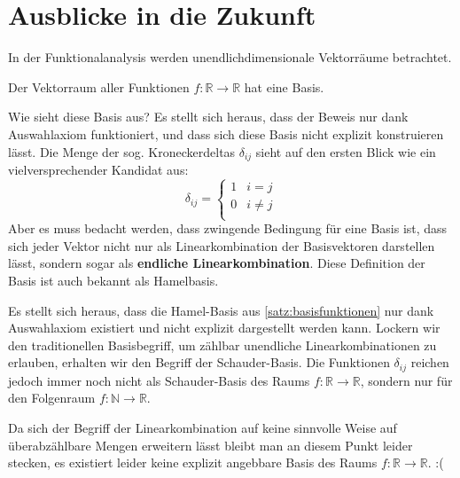 \documentclass{report}
\newcommand*{\newpar}{\par\vspace{\baselineskip}\noindent}
\newcommand{\tbf}[1]{\textbf{#1}}
\newcommand{\bN}{\mathbb{N}}
\newcommand{\bR}{\mathbb{R}}
\begin{document}
\chapter{Ausblicke in die Zukunft}
In der Funktionalanalysis werden unendlichdimensionale Vektorräume betrachtet. 
\begin{theorem}
\label{satz:basisfunktionen}
Der Vektorraum aller Funktionen $f: \bR \to \bR$ hat eine Basis.
\end{theorem}
\newpar
Wie sieht diese Basis aus? Es stellt sich heraus, dass der Beweis nur dank Auswahlaxiom funktioniert, und dass sich diese Basis nicht explizit konstruieren lässt. Die Menge der sog. Kroneckerdeltas $\delta_{ij}$ sieht auf den ersten Blick wie ein vielversprechender Kandidat aus:
\begin{equation*}
 \delta_{ij} = \begin{cases}
            1 & i = j\\
            0 & i \neq j\\
           \end{cases}
\end{equation*}
Aber es muss bedacht werden, dass zwingende Bedingung für eine Basis ist, dass sich jeder Vektor nicht nur als Linearkombination der Basisvektoren darstellen lässt, sondern sogar als \tbf{endliche Linearkombination}. Diese Definition der Basis ist auch bekannt als Hamelbasis.
\newpar
Es stellt sich heraus, dass die Hamel-Basis aus \ref{satz:basisfunktionen} nur dank Auswahlaxiom existiert und nicht explizit dargestellt werden kann. Lockern wir den traditionellen Basisbegriff, um zählbar unendliche Linearkombinationen zu erlauben, erhalten wir den Begriff der Schauder-Basis. Die Funktionen $\delta_{ij}$ reichen jedoch immer noch nicht als Schauder-Basis des Raums $f: \bR \to \bR$, sondern nur für den Folgenraum $f: \bN \to \bR$. 
\newpar
Da sich der Begriff der Linearkombination auf keine sinnvolle Weise auf überabzählbare Mengen erweitern lässt bleibt man an diesem Punkt leider stecken, es existiert leider keine explizit angebbare Basis des Raums $f: \bR \to \bR$. :(
\end{document}
